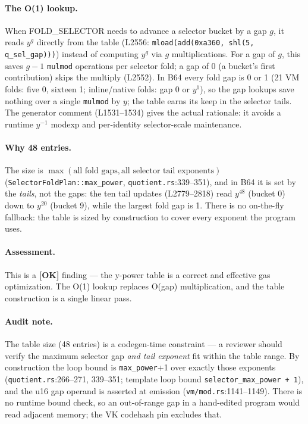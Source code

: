 \paragraph{The O(1) lookup.} When FOLD\_SELECTOR needs to advance
a selector bucket by a gap $g$, it reads $y^g$ directly from the
table (L2556: \texttt{mload(add(0xa360, shl(5, q\_\allowbreak{}sel\_\allowbreak{}gap)))})
instead of computing $y^g$ via $g$ multiplications. For a gap of
$g$, this saves $g - 1$ \texttt{mulmod} operations per selector
fold; a gap of 0 (a bucket's first contribution) skips the
multiply (L2552). In B64 every fold gap is 0 or 1 (21 VM folds:
five 0, sixteen 1; inline/native folds: gap 0 or $y^1$), so the gap
lookups save nothing over a single \texttt{mulmod} by $y$; the
table earns its keep in the selector tails. The generator comment
(L1531--1534) gives the actual rationale: it avoids a runtime
$y^{-1}$ modexp and per-identity selector-scale maintenance.

\paragraph{Why 48 entries.}  The size is
$\max(\text{all fold gaps}, \text{all selector tail exponents})$
(\texttt{SelectorFoldPlan::max\_\allowbreak{}power}, \texttt{quotient.rs}:339--351),
and in B64 it is set by the \emph{tails}, not the gaps: the ten
tail updates (L2779--2818) read $y^{48}$ (bucket 0) down to
$y^{20}$ (bucket 9), while the largest fold gap is 1. There is no
on-the-fly fallback: the table is sized by construction to cover
every exponent the program uses.

\paragraph{Assessment.} This is a
\textcolor{tracegreen}{\textbf{[OK]}} finding --- the y-power
table is a correct and effective gas optimization. The O(1)
lookup replaces O(gap) multiplication, and the table construction
is a single linear pass.

\paragraph{Audit note.} The table size (48 entries) is a
codegen-time constraint --- a reviewer should verify the maximum
selector gap \emph{and tail exponent} fit within the table range.
 By construction the loop bound is
\texttt{max\_power}+1 over exactly those exponents
(\texttt{quotient.rs}:266--271, 339--351; template loop bound
\texttt{selector\_\allowbreak{}max\_\allowbreak{}power + 1}), and the u16 gap operand
is asserted at emission (\texttt{vm/mod.rs}:1141--1149). There is
no runtime bound check, so an out-of-range gap in a hand-edited
program would read adjacent memory; the VK codehash pin excludes
that.

